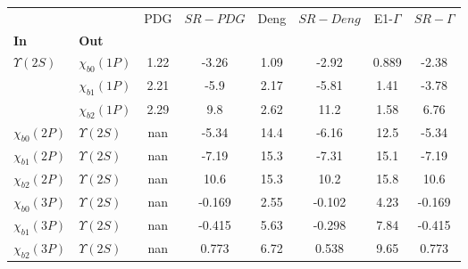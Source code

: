 \begin{tabular}{l|l|c|c|c|c|c|c}
\toprule
                &                &  PDG & $SR-PDG$ &  Deng & $SR-Deng$ &  E1-$\Gamma$ & $SR-\Gamma$ \\
\textbf{In} & \textbf{Out} &      &          &       &           &              &             \\
\midrule
\textbf{$\Upsilon(2S)$} & \textbf{$\chi_{b0}(1P)$} & 1.22 &    -3.26 &  1.09 &     -2.92 &        0.889 &       -2.38 \\
                & \textbf{$\chi_{b1}(1P)$} & 2.21 &     -5.9 &  2.17 &     -5.81 &         1.41 &       -3.78 \\
                & \textbf{$\chi_{b2}(1P)$} & 2.29 &      9.8 &  2.62 &      11.2 &         1.58 &        6.76 \\
\textbf{$\chi_{b0}(2P)$} & \textbf{$\Upsilon(2S)$} &  nan &    -5.34 &  14.4 &     -6.16 &         12.5 &       -5.34 \\
\textbf{$\chi_{b1}(2P)$} & \textbf{$\Upsilon(2S)$} &  nan &    -7.19 &  15.3 &     -7.31 &         15.1 &       -7.19 \\
\textbf{$\chi_{b2}(2P)$} & \textbf{$\Upsilon(2S)$} &  nan &     10.6 &  15.3 &      10.2 &         15.8 &        10.6 \\
\textbf{$\chi_{b0}(3P)$} & \textbf{$\Upsilon(2S)$} &  nan &   -0.169 &  2.55 &    -0.102 &         4.23 &      -0.169 \\
\textbf{$\chi_{b1}(3P)$} & \textbf{$\Upsilon(2S)$} &  nan &   -0.415 &  5.63 &    -0.298 &         7.84 &      -0.415 \\
\textbf{$\chi_{b2}(3P)$} & \textbf{$\Upsilon(2S)$} &  nan &    0.773 &  6.72 &     0.538 &         9.65 &       0.773 \\
\bottomrule
\end{tabular}
